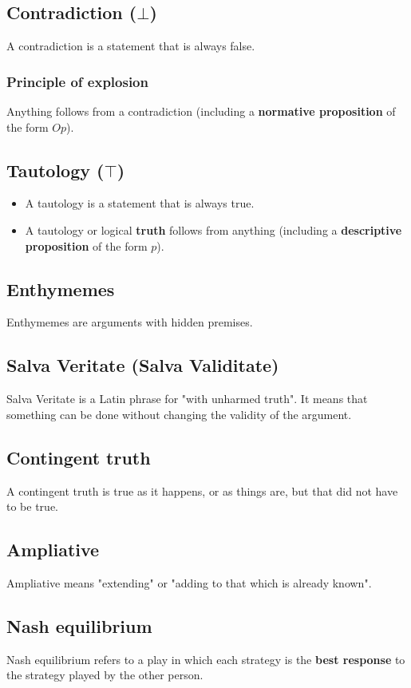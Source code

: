 \documentclass[11pt]{article}
\begin{document}
\subsection{Contradiction (\(\bot\))}
\label{sec:org905b37a}
A contradiction is a statement that is always false.
\subsubsection{Principle of explosion}
\label{sec:org8ac2549}
Anything follows from a contradiction (including a \textbf{normative proposition} of the form \(Op\)).
\subsection{Tautology (\(\top\))}
\label{sec:org5177ecb}
\begin{itemize}
\item A tautology is a statement that is always true.
\item A tautology or logical \textbf{truth} follows from anything (including a \textbf{descriptive proposition} of the form \(p\)).
\end{itemize}
\subsection{Enthymemes}
\label{sec:orgb8bbcb4}
Enthymemes are arguments with hidden premises.
\subsection{Salva Veritate (Salva Validitate)}
\label{sec:org81dada5}
Salva Veritate is a Latin phrase for "with unharmed truth". It means that something can be done without changing the validity of the argument.
\subsection{Contingent truth}
\label{sec:org798d9c4}
A contingent truth is true as it happens, or as things are, but that did not have to be true.
\subsection{Ampliative}
\label{sec:org8eb539a}
Ampliative means "extending" or "adding to that which is already known".

 \newpage
\subsection{Nash equilibrium}
\label{sec:org6d729d7}
Nash equilibrium refers to a play in which each strategy is the \textbf{best response} to the strategy played by the other person.
\end{document}
